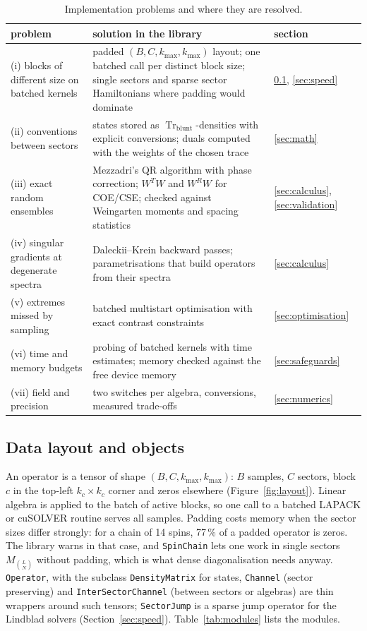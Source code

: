 \documentclass[11pt]{article}
\DeclareMathOperator{\Tr}{Tr}
\begin{document}
\begin{table}[t]
\centering\footnotesize
\begin{tabular}{>{\raggedright\arraybackslash}p{}>{\raggedright\arraybackslash}p{}l}
\toprule
problem & solution in the library & section\\
\midrule
(i) blocks of different size on batched kernels & padded $(B,C,k_{\max},k_{\max})$ layout; one batched call per
distinct block size; single sectors and sparse sector Hamiltonians where padding would dominate & \ref{sec:layout}, \ref{sec:speed}\\
(ii) conventions between sectors & states stored as $\Tr_{\mathrm{blunt}}$-densities with explicit conversions; duals
computed with the weights of the chosen trace & \ref{sec:math}\\
(iii) exact random ensembles & Mezzadri's QR algorithm with phase correction; $W^TW$ and $W^RW$ for COE/CSE; checked
against Weingarten moments and spacing statistics & \ref{sec:calculus}, \ref{sec:validation}\\
(iv) singular gradients at degenerate spectra & Daleckii--Krein backward passes; parametrisations that build operators
from their spectra & \ref{sec:calculus}\\
(v) extremes missed by sampling & batched multistart optimisation with exact contrast constraints & \ref{sec:optimisation}\\
(vi) time and memory budgets & probing of batched kernels with time estimates; memory checked against the free
device memory & \ref{sec:safeguards}\\
(vii) field and precision & two switches per algebra, conversions, measured trade-offs & \ref{sec:numerics}\\
\bottomrule
\end{tabular}
\caption{Implementation problems and where they are resolved.}
\label{tab:challenges}
\end{table}

\subsection{Data layout and objects}\label{sec:layout}

An operator is a tensor of shape $(B,C,k_{\max},k_{\max})$: $B$ samples, $C$ sectors, block $c$ in the top-left
$k_c\times k_c$ corner and zeros elsewhere (Figure~\ref{fig:layout}). Linear algebra is applied to the batch of active
blocks, so one call to a batched LAPACK or cuSOLVER routine serves all samples. Padding costs memory when the sector
sizes differ strongly: for a chain of 14 spins, 77\,\% of a padded operator is zeros. The library warns in that case,
and \texttt{SpinChain} lets one work in single sectors $M_{\binom LN}$ without padding, which is what dense
diagonalisation needs anyway. \texttt{Operator}, with the subclass \texttt{DensityMatrix} for states,
\texttt{Channel} (sector preserving) and \texttt{InterSectorChannel} (between sectors or algebras) are thin wrappers
around such tensors; \texttt{SectorJump} is a sparse jump operator for the Lindblad solvers (Section~\ref{sec:speed}).
Table~\ref{tab:modules} lists the modules.
\end{document}
